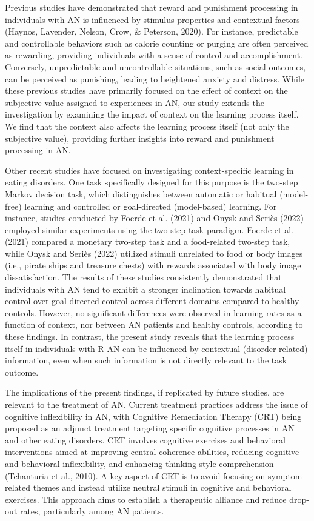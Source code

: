 \documentclass[
  man,floatsintext]{apa6}
\begin{document}
Previous studies have demonstrated that reward and punishment processing in individuals with AN is influenced by stimulus properties and contextual factors (Haynos, Lavender, Nelson, Crow, \& Peterson, 2020). For instance, predictable and controllable behaviors such as calorie counting or purging are often perceived as rewarding, providing individuals with a sense of control and accomplishment. Conversely, unpredictable and uncontrollable situations, such as social outcomes, can be perceived as punishing, leading to heightened anxiety and distress. While these previous studies have primarily focused on the effect of context on the subjective value assigned to experiences in AN, our study extends the investigation by examining the impact of context on the learning process itself. We find that the context also affects the learning process itself (not only the subjective value), providing further insights into reward and punishment processing in AN.

Other recent studies have focused on investigating context-specific learning in eating disorders. One task specifically designed for this purpose is the two-step Markov decision task, which distinguishes between automatic or habitual (model-free) learning and controlled or goal-directed (model-based) learning. For instance, studies conducted by Foerde et al. (2021) and Onysk and Seriès (2022) employed similar experiments using the two-step task paradigm. Foerde et al. (2021) compared a monetary two-step task and a food-related two-step task, while Onysk and Seriès (2022) utilized stimuli unrelated to food or body images (i.e., pirate ships and treasure chests) with rewards associated with body image dissatisfaction. The results of these studies consistently demonstrated that individuals with AN tend to exhibit a stronger inclination towards habitual control over goal-directed control across different domains compared to healthy controls. However, no significant differences were observed in learning rates as a function of context, nor between AN patients and healthy controls, according to these findings. In contrast, the present study reveals that the learning process itself in individuals with R-AN can be influenced by contextual (disorder-related) information, even when such information is not directly relevant to the task outcome.

The implications of the present findings, if replicated by future studies, are relevant to the treatment of AN. Current treatment practices address the issue of cognitive inflexibility in AN, with Cognitive Remediation Therapy (CRT) being proposed as an adjunct treatment targeting specific cognitive processes in AN and other eating disorders. CRT involves cognitive exercises and behavioral interventions aimed at improving central coherence abilities, reducing cognitive and behavioral inflexibility, and enhancing thinking style comprehension (Tchanturia et al., 2010). A key aspect of CRT is to avoid focusing on symptom-related themes and instead utilize neutral stimuli in cognitive and behavioral exercises. This approach aims to establish a therapeutic alliance and reduce drop-out rates, particularly among AN patients.
\end{document}
